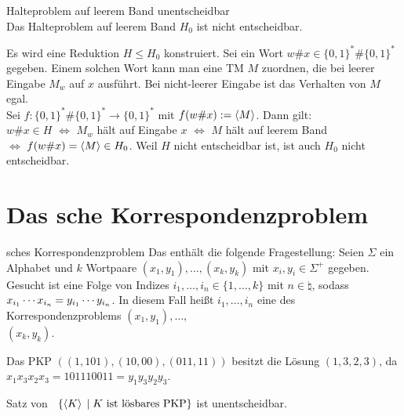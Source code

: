 \begin{Satz}{Halteproblem auf leerem Band unentscheidbar}\\
    Das Halteproblem auf leerem Band $H_0$ ist nicht entscheidbar.
\end{Satz}

\begin{Beweis}
    Es wird eine Reduktion $H \le H_0$ konstruiert.
    Sei ein Wort $w\# x \in \{0, 1\}^\ast \# \{0, 1\}^\ast$ gegeben.
    Einem solchen Wort kann man eine TM $M$ zuordnen,
    die bei leerer Eingabe $M_w$ auf $x$ ausführt.
    Bei nicht-leerer Eingabe ist das Verhalten von $M$ egal.\\
    Sei $f\colon \{0, 1\}^\ast \# \{0, 1\}^\ast \rightarrow \{0, 1\}^\ast$ mit
    $f(w\# x) := \left\langle M\right\rangle$.
    Dann gilt:\\
    $w\# x \in H$ $\iff$
    $M_w$ hält auf Eingabe $x$ $\iff$
    $M$ hält auf leerem Band\\
    $\iff$
    $f(w\# x) = \left\langle M\right\rangle \in H_0$.
    Weil $H$ nicht entscheidbar ist, ist auch $H_0$ nicht entscheidbar.
\end{Beweis}

\pagebreak

\section{%
    Das sche Korrespondenzproblem%
}

\begin{Def}{sches Korrespondenzproblem}
    Das  enthält die folgende Fragestellung:
    Seien $\Sigma$ ein Alphabet und $k$ Wortpaare $(x_1, y_1), \dotsc, (x_k, y_k)$ mit
    $x_i, y_i \in \Sigma^+$ gegeben.
    Gesucht ist eine Folge von Indizes $i_1, \dotsc, i_n \in \{1, \dotsc, k\}$ mit
    $n \in \natural$, sodass $x_{i_1} \dotsb x_{i_n} \hspace*{-0.12mm}= y_{i_1} \dotsb y_{i_n}$.
    In diesem Fall heißt $i_1, \dotsc, i_n$ eine  des Korrespondenzproblems
    $(x_1, y_1), \dotsc,$\\
    $(x_k, y_k)$.
\end{Def}

\begin{Bsp}
    Das PKP $((1, 101), (10, 00), (011, 11))$ besitzt die Lösung
    $(1, 3, 2, 3)$, da $x_1 x_3 x_2 x_3 = 101110011 = y_1 y_3 y_2 y_3$.
\end{Bsp}

\begin{Satz}{Satz von \upshape\,\!}
    $\{\left\langle K\right\rangle \;|\; K \text{ ist lösbares PKP}\}$ ist unentscheidbar.
\end{Satz}

